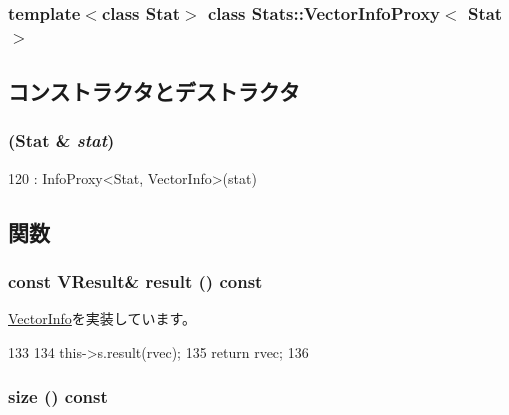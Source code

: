 \subsubsection*{template$<$class Stat$>$ class Stats::VectorInfoProxy$<$ Stat $>$}



\subsection{コンストラクタとデストラクタ}
\hypertarget{classStats_1_1VectorInfoProxy_a852186b7ffb391d0f3c372fd087cf964}{
\subsubsection[{VectorInfoProxy}]{ (Stat \& {\em stat})}}
\label{classStats_1_1VectorInfoProxy_a852186b7ffb391d0f3c372fd087cf964}



\begin{DoxyCode}
120 : InfoProxy<Stat, VectorInfo>(stat) {}
\end{DoxyCode}


\subsection{関数}
\hypertarget{classStats_1_1VectorInfoProxy_aba312f9e3431b1652f8b3ddf3fe105dc}{
\subsubsection[{result}]{\setlength{\rightskip}{0pt plus 5cm}const {\bf VResult}\& result () const}}
\label{classStats_1_1VectorInfoProxy_aba312f9e3431b1652f8b3ddf3fe105dc}


\hyperlink{classStats_1_1VectorInfo_a7fcf57115122663db42f39cc18ca0f62}{VectorInfo}を実装しています。


\begin{DoxyCode}
133     {
134         this->s.result(rvec);
135         return rvec;
136     }
\end{DoxyCode}
\hypertarget{classStats_1_1VectorInfoProxy_a503ab01f6c0142145d3434f6924714e7}{
\subsubsection[{size}]{ size () const}}
\label{classStats_1_1VectorInfoProxy_a503ab01f6c0142145d3434f6924714e7}


